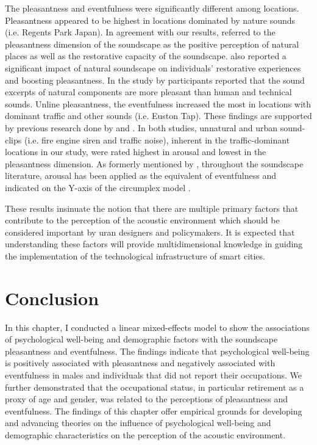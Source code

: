 The pleasantness and eventfulness were significantly different among locations. Pleasantness appeared to be highest in locations dominated by nature sounds (i.e. Regents Park Japan). In agreement with our results, \citet{Payne2013production} referred to the pleasantness dimension of the soundscape as the positive perception of natural places as well as the restorative capacity of the soundscape. \citet{Zhang2014Research} also reported a significant impact of natural soundscape on individuals' restorative experiences and boosting pleasantness. In the study by \citet{Axelsson2010principal} participants reported that the sound excerpts of natural components are more pleasant than human and technical sounds. Unline pleasantness, the eventfulness increased the most in locations with dominant traffic and other sounds (i.e. Euston Tap). These findings are supported by previous research done by \citet{Bradley2000Emotion} and \citet{Hume2013Physiological}. In both studies, unnatural and urban sound-clips (i.e. fire engine siren and traffic noise), inherent in the traffic-dominant locations in our study, were rated highest in arousal and lowest in the pleasantness dimension. As formerly mentioned by \citet{Erfanian2019Psychophysiological}, throughout the soundscape literature, arousal has been applied as the equivalent of eventfulness and indicated on the Y-axis of the circumplex model \citep{Axelsson2010principal,Erfanian2019Psychophysiological}.

These results insinuate the notion that there are multiple primary factors \citep{Bradley2000Emotion} that contribute to the perception of the acoustic environment which should be considered important by uran designers and policymakers. It is expected that understanding these factors will provide multidimensional knowledge in guiding the implementation of the technological infrastructure of smart cities.


\section{Conclusion}

In this chapter, I conducted a linear mixed-effects model to show the associations of psychological well-being and demographic factors with the soundscape pleasantness and eventfulness. The findings indicate that psychological well-being is positively associated with pleasantness and negatively associated with eventfulness in males and individuals that did not report their occupations. We further demonstrated that the occupational status, in particular retirement as a proxy of age and gender, was related to the perceptions of pleasantness and eventfulness. The findings of this chapter offer empirical grounds for developing and advancing theories on the influence of psychological well-being and demographic characteristics on the perception of the acoustic environment. 